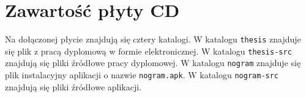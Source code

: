\chapter{Zawartość płyty CD}
\thispagestyle{chapterBeginStyle}
\label{plytaCD}

Na dołączonej płycie znajdują się cztery katalogi. 
W katalogu \texttt{thesis} znajduje się plik z pracą dyplomową w formie elektronicznej. 
W katalogu \texttt{thesis-src} znajdują się pliki źródłowe pracy dyplomowej.
W katalogu \texttt{nogram} znajduje się plik instalacyjny aplikacji o nazwie \texttt{nogram.apk}.
W katalogu \texttt{nogram-src} znajdują się pliki źródłowe aplikacji.
